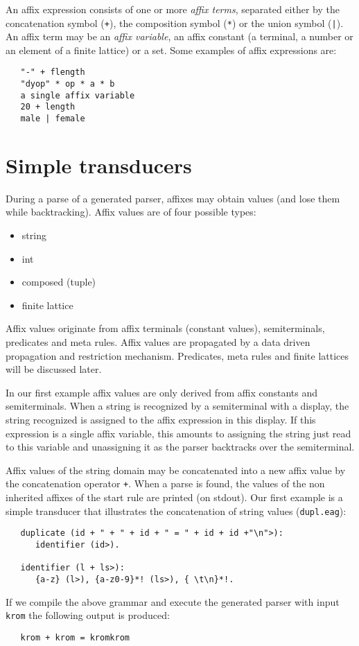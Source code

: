An affix expression consists of one or more {\em affix terms},
separated either by the concatenation symbol (\verb.+.), the
composition symbol (\verb+*+) or the union symbol (\verb+|+).
An affix term may be an {\em affix variable}, an affix constant
(a terminal, a number or an element of a finite lattice) or a set.
Some examples of affix expressions are:
\begin{verbatim}
   "-" + flength
   "dyop" * op * a * b
   a single affix variable
   20 + length
   male | female
\end{verbatim}
\section {Simple transducers}
During a parse of a generated parser, affixes may obtain values
(and lose them while backtracking). Affix values are of four
possible types:
\begin {itemize}
\item string
\item int
\item composed (tuple)
\item finite lattice
\end {itemize}
Affix values originate from affix terminals (constant values),
semiterminals, pre\-dicates and meta rules. Affix values are propagated
by a data driven propagation and restriction mechanism. Predicates,
meta rules and finite lattices will be discussed later.

In our first example affix values are only derived from affix
constants and semiterminals. When a string is recognized by
a semiterminal with a display, the string recognized is
assigned to the affix expression in this display.
If this expression is a single affix variable, this amounts to
assigning the string just read to this variable and unassigning
it as the parser backtracks over the semiterminal.

Affix values of the string domain may be concatenated into
a new affix value by the concatenation operator \verb.+..
When a parse is found, the values of the non inherited affixes of the
start rule are printed (on stdout). 
Our first example is a simple transducer that illustrates
the concatenation of string values ({\tt dupl.eag}):
\begin{verbatim}
   duplicate (id + " + " + id + " = " + id + id +"\n">):
      identifier (id>).

   identifier (l + ls>):
      {a-z} (l>), {a-z0-9}*! (ls>), { \t\n}*!.
\end{verbatim}
If we compile the above grammar and execute the generated parser
with input {\tt krom} the following output is produced:
\begin{verbatim}
   krom + krom = kromkrom
\end{verbatim}


